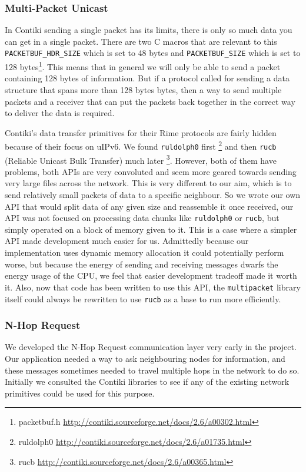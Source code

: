 \subsubsection{Multi-Packet Unicast}

In Contiki sending a single packet has its limits, there is only so much data you can get in a single packet. There are two C macros that are relevant to this \verb|PACKETBUF_HDR_SIZE| which is set to 48 bytes and \verb|PACKETBUF_SIZE| which is set to 128 bytes\footnote{packetbuf.h \url{http://contiki.sourceforge.net/docs/2.6/a00302.html}}. This means that in general we will only be able to send a packet containing 128 bytes of information. But if a protocol called for sending a data structure that spans more than 128 bytes bytes, then a way to send multiple packets and a receiver that can put the packets back together in the correct way to deliver the data is required.

Contiki's data transfer primitives for their Rime protocols are fairly hidden because of their focus on uIPv6. We found \verb|ruldolph0| first \footnote{ruldolph0 \url{http://contiki.sourceforge.net/docs/2.6/a01735.html}} and then \verb|rucb| (Reliable Unicast Bulk Transfer) much later \footnote{rucb \url{http://contiki.sourceforge.net/docs/2.6/a00365.html}}. However, both of them have problems, both APIs are very convoluted and seem more geared towards sending very large files across the network. This is very different to our aim, which is to send relatively small packets of data to a specific neighbour. So we wrote our own API that would split data of any given size and reassemble it once received, our API was not focused on processing data chunks like \verb|ruldolph0| or \verb|rucb|, but simply operated on a block of memory given to it. This is a case where a simpler API made development much easier for us. Admittedly because our implementation uses dynamic memory allocation it could potentially perform worse, but because the energy of sending and receiving messages dwarfs the energy usage of the CPU, we feel that easier development tradeoff made it worth it. Also, now that code has been written to use this API, the \verb|multipacket| library itself could always be rewritten to use \verb|rucb| as a base to run more efficiently.

\subsubsection{N-Hop Request} 

We developed the N-Hop Request communication layer very early in the project. Our application needed a way to ask neighbouring nodes for information, and these messages sometimes needed to travel multiple hops in the network to do so. Initially we consulted the Contiki libraries to see if any of the existing network primitives could be used for this purpose.

